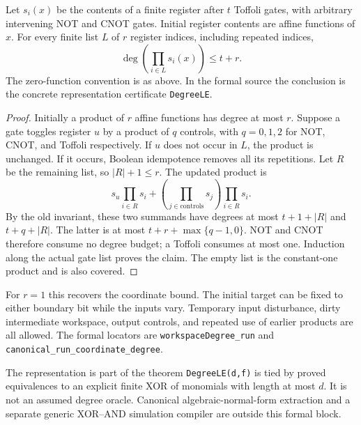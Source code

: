 \begin{theorem}\label{c:thm:register-products}
Let $s_i(x)$ be the contents of a finite register after $t$ Toffoli gates, with arbitrary intervening NOT and CNOT gates. Initial register contents are affine functions of $x$. For every finite list $L$ of $r$ register indices, including repeated indices,
\[
 \deg\left(\prod_{i\in L}s_i(x)\right)\le t+r.
\]
The zero-function convention is as above. In the formal source the conclusion is the concrete representation certificate \texttt{DegreeLE}.
\end{theorem}
\begin{proof}
Initially a product of $r$ affine functions has degree at most $r$. Suppose a gate toggles register $u$ by a product of $q$ controls, with $q=0,1,2$ for NOT, CNOT, and Toffoli respectively. If $u$ does not occur in $L$, the product is unchanged. If it occurs, Boolean idempotence removes all its repetitions. Let $R$ be the remaining list, so $|R|+1\le r$. The updated product is
\[
 s_u\prod_{i\in R}s_i+
 \left(\prod_{j\in\mathrm{controls}}s_j\right)\prod_{i\in R}s_i.
\]
By the old invariant, these two summands have degrees at most $t+1+|R|$ and $t+q+|R|$. The latter is at most $t+r+\max\{q-1,0\}$. NOT and CNOT therefore consume no degree budget; a Toffoli consumes at most one. Induction along the actual gate list proves the claim. The empty list is the constant-one product and is also covered.
\end{proof}
For $r=1$ this recovers the coordinate bound. The initial target can be fixed to either boundary bit while the inputs vary. Temporary input disturbance, dirty intermediate workspace, output controls, and repeated use of earlier products are all allowed. The formal locators are \texttt{workspaceDegree\_run} and \texttt{canonical\_run\_coordinate\_degree}.

\begin{circuitscopebox}{The representation is part of the theorem}
\texttt{DegreeLE(d,f)} is tied by proved equivalences to an explicit finite XOR of monomials with length at most $d$. It is not an assumed degree oracle. Canonical algebraic-normal-form extraction and a separate generic XOR--AND simulation compiler are outside this formal block.
\end{circuitscopebox}

